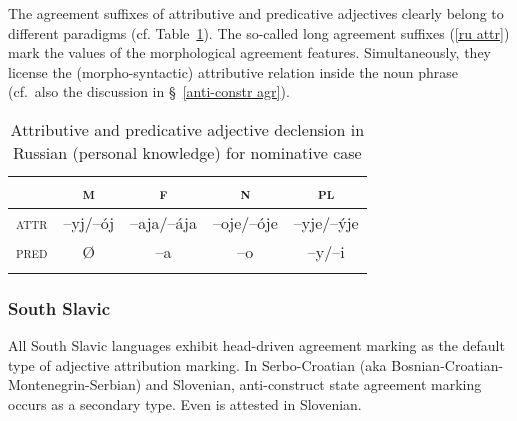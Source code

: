 The agreement suffixes of attributive and predicative adjectives clearly belong to different paradigms (cf. Table~\ref{Russian adj agr paradigm}). The so-called long agreement suffixes (\ref{ru attr}) mark the values of the morphological agreement features. Simultaneously, they license the (morpho-syntactic) attributive relation inside the noun phrase (cf.~also the discussion in \S~\ref{anti-constr agr}). 
\begin{table}[h]
\begin{tabular}{l c c c c}
\lsptoprule			
			&\textsc{m}	&\textsc{f}		&\textsc{n}	&\textsc{pl}\\
\midrule
\textsc{attr}	&–yj/–ój		&–aja/–ája	&–oje/–óje	&–yje/–\'yje\\
\textsc{pred}	&{Ø}		&–a			&–o			&–y/–i\\
\lspbottomrule
\end{tabular}
\caption[Adjective paradigm for Russian]{Attributive and predicative adjective declension in Russian (personal knowledge) for nominative case}
\label{Russian adj agr paradigm}
\end{table}

\subsubsection{South Slavic} \label{s-slavic synchr}
All South Slavic languages exhibit head\hyp{}driven agreement marking as the default type of adjective attribution marking. In Serbo-Croatian (aka Bosnian-Croatian-Montenegrin-Serbian) and Slovenian, anti\hyp{}construct state agreement marking occurs as a secondary type. Even  is attested in Slovenian.

